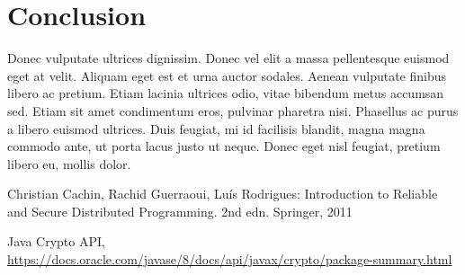 \documentclass[runningheads]{llncs}
\begin{document}
\section{Conclusion}
Donec vulputate ultrices dignissim. Donec vel elit a massa pellentesque euismod
eget at velit. Aliquam eget est et urna auctor sodales. Aenean vulputate finibus
libero ac pretium. Etiam lacinia ultrices odio, vitae bibendum metus accumsan
sed. Etiam sit amet condimentum eros, pulvinar pharetra nisi. Phasellus ac purus
a libero euismod ultrices. Duis feugiat, mi id facilisis blandit, magna magna
commodo ante, ut porta lacus justo ut neque. Donec eget nisl feugiat, pretium
libero eu, mollis dolor.

\begin{thebibliography}{8}

Christian Cachin, Rachid Guerraoui, Luís Rodrigues: Introduction to Reliable and
Secure Distributed Programming. 2nd edn. Springer, 2011

Java Crypto API,
\url{https://docs.oracle.com/javase/8/docs/api/javax/crypto/package-summary.html}
\end{thebibliography}
\end{document}
